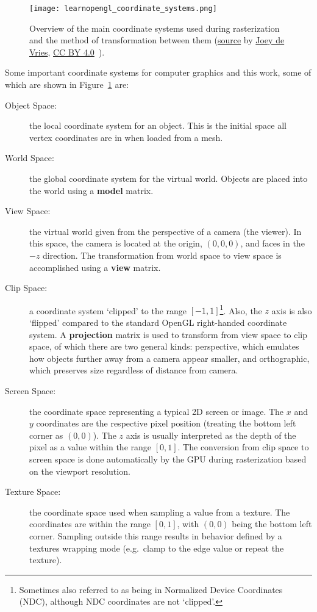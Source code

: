 \begin{figure}[h]
\centering
\texttt{[image: learnopengl\_coordinate\_systems.png]}
\caption{Overview of the main coordinate systems used during rasterization and the method of transformation between them (\href{https://learnopengl.com/img/getting-started/coordinate_systems.png}{source} by \href{https://twitter.com/JoeyDeVriez}{Joey de Vries}, \href{https://creativecommons.org/licenses/by/4.0/}{CC BY 4.0}~\cite{learnopengl}).}
\label{fig:coordinate_systems}
\end{figure}

Some important coordinate systems for computer graphics and this work, some of which are shown in Figure~\ref{fig:coordinate_systems} are:
\begin{description}
    \item[Object Space:] the local coordinate system for an object. This is the initial space all vertex coordinates are in when loaded from a mesh.
    \item[World Space:] the global coordinate system for the virtual world. Objects are placed into the world using a \textbf{model} matrix.
    \item[View Space:] the virtual world given from the perspective of a camera (the viewer). In this space, the camera is located at the origin, $(0,0,0)$, and faces in the $-z$ direction. The transformation from world space to view space is accomplished using a \textbf{view} matrix.
    \item[Clip Space:] a coordinate system `clipped' to the range $[-1, 1]$\footnote{Sometimes also referred to as being in Normalized Device Coordinates (NDC), although NDC coordinates are not `clipped'.}. Also, the $z$ axis is also `flipped' compared to the standard OpenGL right-handed coordinate system. A \textbf{projection} matrix is used to transform from view space to clip space, of which there are two general kinds: perspective, which emulates how objects further away from a camera appear smaller, and orthographic, which preserves size regardless of distance from camera.
    \item[Screen Space:] the coordinate space representing a typical 2D screen or image. The $x$ and $y$ coordinates are the respective pixel position (treating the bottom left corner as $(0,0)$). The $z$ axis is usually interpreted as the depth of the pixel as a value within the range $[0, 1]$. The conversion from clip space to screen space is done automatically by the GPU during rasterization based on the viewport resolution.
    \item[Texture Space:] the coordinate space used when sampling a value from a texture. The coordinates are within the range $[0, 1]$, with $(0, 0)$ being the bottom left corner. Sampling outside this range results in behavior defined by a textures wrapping mode (e.g.\ clamp to the edge value or repeat the texture).

\end{description}
